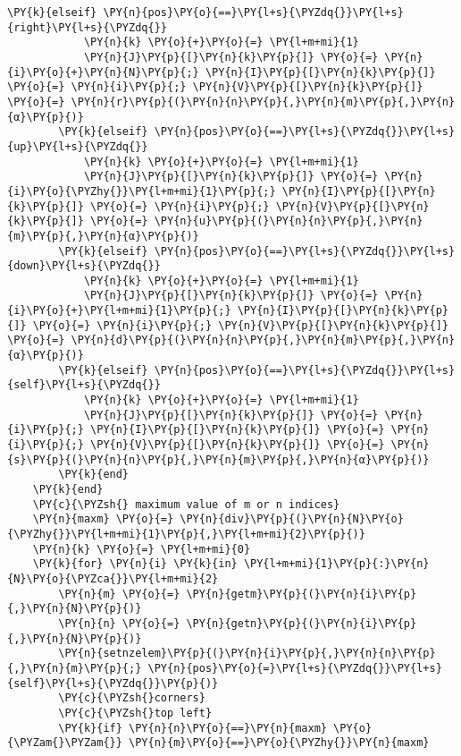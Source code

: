 \begin{Verbatim}[commandchars=\\\{\}]
        \PY{k}{elseif} \PY{n}{pos}\PY{o}{==}\PY{l+s}{\PYZdq{}}\PY{l+s}{right}\PY{l+s}{\PYZdq{}}
            \PY{n}{k} \PY{o}{+}\PY{o}{=} \PY{l+m+mi}{1}
            \PY{n}{J}\PY{p}{[}\PY{n}{k}\PY{p}{]} \PY{o}{=} \PY{n}{i}\PY{o}{+}\PY{n}{N}\PY{p}{;} \PY{n}{I}\PY{p}{[}\PY{n}{k}\PY{p}{]} \PY{o}{=} \PY{n}{i}\PY{p}{;} \PY{n}{V}\PY{p}{[}\PY{n}{k}\PY{p}{]} \PY{o}{=} \PY{n}{r}\PY{p}{(}\PY{n}{n}\PY{p}{,}\PY{n}{m}\PY{p}{,}\PY{n}{α}\PY{p}{)}
        \PY{k}{elseif} \PY{n}{pos}\PY{o}{==}\PY{l+s}{\PYZdq{}}\PY{l+s}{up}\PY{l+s}{\PYZdq{}}
            \PY{n}{k} \PY{o}{+}\PY{o}{=} \PY{l+m+mi}{1}
            \PY{n}{J}\PY{p}{[}\PY{n}{k}\PY{p}{]} \PY{o}{=} \PY{n}{i}\PY{o}{\PYZhy{}}\PY{l+m+mi}{1}\PY{p}{;} \PY{n}{I}\PY{p}{[}\PY{n}{k}\PY{p}{]} \PY{o}{=} \PY{n}{i}\PY{p}{;} \PY{n}{V}\PY{p}{[}\PY{n}{k}\PY{p}{]} \PY{o}{=} \PY{n}{u}\PY{p}{(}\PY{n}{n}\PY{p}{,}\PY{n}{m}\PY{p}{,}\PY{n}{α}\PY{p}{)}
        \PY{k}{elseif} \PY{n}{pos}\PY{o}{==}\PY{l+s}{\PYZdq{}}\PY{l+s}{down}\PY{l+s}{\PYZdq{}}
            \PY{n}{k} \PY{o}{+}\PY{o}{=} \PY{l+m+mi}{1}
            \PY{n}{J}\PY{p}{[}\PY{n}{k}\PY{p}{]} \PY{o}{=} \PY{n}{i}\PY{o}{+}\PY{l+m+mi}{1}\PY{p}{;} \PY{n}{I}\PY{p}{[}\PY{n}{k}\PY{p}{]} \PY{o}{=} \PY{n}{i}\PY{p}{;} \PY{n}{V}\PY{p}{[}\PY{n}{k}\PY{p}{]} \PY{o}{=} \PY{n}{d}\PY{p}{(}\PY{n}{n}\PY{p}{,}\PY{n}{m}\PY{p}{,}\PY{n}{α}\PY{p}{)}
        \PY{k}{elseif} \PY{n}{pos}\PY{o}{==}\PY{l+s}{\PYZdq{}}\PY{l+s}{self}\PY{l+s}{\PYZdq{}}
            \PY{n}{k} \PY{o}{+}\PY{o}{=} \PY{l+m+mi}{1}
            \PY{n}{J}\PY{p}{[}\PY{n}{k}\PY{p}{]} \PY{o}{=} \PY{n}{i}\PY{p}{;} \PY{n}{I}\PY{p}{[}\PY{n}{k}\PY{p}{]} \PY{o}{=} \PY{n}{i}\PY{p}{;} \PY{n}{V}\PY{p}{[}\PY{n}{k}\PY{p}{]} \PY{o}{=} \PY{n}{s}\PY{p}{(}\PY{n}{n}\PY{p}{,}\PY{n}{m}\PY{p}{,}\PY{n}{α}\PY{p}{)}
        \PY{k}{end}
    \PY{k}{end}
    \PY{c}{\PYZsh{} maximum value of m or n indices}
    \PY{n}{maxm} \PY{o}{=} \PY{n}{div}\PY{p}{(}\PY{n}{N}\PY{o}{\PYZhy{}}\PY{l+m+mi}{1}\PY{p}{,}\PY{l+m+mi}{2}\PY{p}{)}
    \PY{n}{k} \PY{o}{=} \PY{l+m+mi}{0}
    \PY{k}{for} \PY{n}{i} \PY{k}{in} \PY{l+m+mi}{1}\PY{p}{:}\PY{n}{N}\PY{o}{\PYZca{}}\PY{l+m+mi}{2}
        \PY{n}{m} \PY{o}{=} \PY{n}{getm}\PY{p}{(}\PY{n}{i}\PY{p}{,}\PY{n}{N}\PY{p}{)}
        \PY{n}{n} \PY{o}{=} \PY{n}{getn}\PY{p}{(}\PY{n}{i}\PY{p}{,}\PY{n}{N}\PY{p}{)}
        \PY{n}{setnzelem}\PY{p}{(}\PY{n}{i}\PY{p}{,}\PY{n}{n}\PY{p}{,}\PY{n}{m}\PY{p}{;} \PY{n}{pos}\PY{o}{=}\PY{l+s}{\PYZdq{}}\PY{l+s}{self}\PY{l+s}{\PYZdq{}}\PY{p}{)}
        \PY{c}{\PYZsh{}corners}
        \PY{c}{\PYZsh{}top left}
        \PY{k}{if} \PY{n}{n}\PY{o}{==}\PY{n}{maxm} \PY{o}{\PYZam{}\PYZam{}} \PY{n}{m}\PY{o}{==}\PY{o}{\PYZhy{}}\PY{n}{maxm}

\end{Verbatim}
